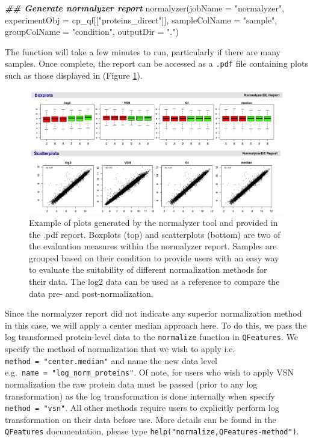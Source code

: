 \documentclass[9pt,a4paper,]{extarticle}
\newenvironment{Shaded}{\begin{snugshade}}{\end{snugshade}}
\newcommand{\AttributeTok}[1]{\textcolor[rgb]{0.77,0.63,0.00}{#1}}
\newcommand{\DocumentationTok}[1]{\textcolor[rgb]{0.56,0.35,0.01}{\textbf{\textit{#1}}}}
\newcommand{\FunctionTok}[1]{\textcolor[rgb]{0.00,0.00,0.00}{#1}}
\newcommand{\NormalTok}[1]{#1}
\newcommand{\StringTok}[1]{\textcolor[rgb]{0.31,0.60,0.02}{#1}}
\begin{document}
\begin{Shaded}
\begin{Highlighting}[]
\DocumentationTok{\#\# Generate normalyzer report}
\FunctionTok{normalyzer}\NormalTok{(}\AttributeTok{jobName =} \StringTok{"normalyzer"}\NormalTok{,}
           \AttributeTok{experimentObj =}\NormalTok{ cp\_qf[[}\StringTok{"proteins\_direct"}\NormalTok{]],}
           \AttributeTok{sampleColName =} \StringTok{"sample"}\NormalTok{,}
           \AttributeTok{groupColName =} \StringTok{"condition"}\NormalTok{,}
           \AttributeTok{outputDir =} \StringTok{"."}\NormalTok{)}
\end{Highlighting}
\end{Shaded}

The function will take a few minutes to run, particularly if there are many
samples. Once complete, the report can be accessed as a \texttt{.pdf} file containing
plots such as those displayed in (Figure \ref{fig:normalyzer-figure}).

\begin{figure}

{\centering \includegraphics[width=0.85\linewidth]{Images/normalyzerreport} 

}

\caption{Example of plots generated by the normalyzer tool and provided in the .pdf report. Boxplots (top) and scatterplots (bottom) are two of the evaluation measures within the normalyzer report. Samples are grouped based on their condition to provide users with an easy way to evaluate the suitability of different normalization methods for their data. The log2 data can be used as a reference to compare the data pre- and post-normalization.}\label{fig:normalyzer-figure}
\end{figure}

Since the normalyzer report did not indicate any superior normalization method
in this case, we will apply a center median approach here. To do this, we pass
the log transformed protein-level data to the \texttt{normalize} function in
\texttt{QFeatures}. We specify the method of normalization that we wish to apply i.e.
\texttt{method\ =\ "center.median"} and name the new data level e.g.~\texttt{name\ =\ "log\_norm\_proteins"}.
Of note, for users who wish to apply VSN normalization the raw protein data must
be passed (prior to any log transformation) as the log transformation is done
internally when specify \texttt{method\ =\ "vsn"}. All other methods require users to
explicitly perform log transformation on their data before use. More details
can be found in the \texttt{QFeatures} documentation, please type \texttt{help("normalize,QFeatures-method")}.
\end{document}
